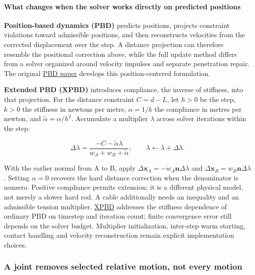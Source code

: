 \paragraph{What changes when the solver works directly on predicted positions}\label{06-engine-ii-ch033-what-changes-when-the-solver-works-directly-on-predicted-positions}

\hypertarget{06-engine-ii-ch033-what-changes-when-the-solver-works-directly-on-predicted-positions}{}

\textbf{Position-based dynamics (PBD)} predicts positions, projects constraint violations toward admissible positions, and then reconstructs velocities from the corrected displacement over the step. A distance projection can therefore resemble the positional correction above, while the full update method differs from a solver organized around velocity impulses and separate penetration repair. The original \href{https://doi.org/10.2312/PE/vriphys/vriphys06/071-080}{PBD paper} develops this position-centered formulation.

\textbf{Extended PBD (XPBD)} introduces compliance, the inverse of stiffness, into that projection. For the distance constraint \(C=d-L\), let \(h>0\) be the step, \(k>0\) the stiffness in newtons per metre, \(\alpha=1/k\) the compliance in metres per newton, and \(\widetilde\alpha=\alpha/h^2\). Accumulate a multiplier \(\lambda\) across solver iterations within the step:

\[
\Delta\lambda=\frac{-C-\widetilde\alpha\lambda}{w_A+w_B+\widetilde\alpha},\qquad
\lambda\leftarrow\lambda+\Delta\lambda.
\]

With the earlier normal from A to B, apply \(\Delta\mathbf x_A=-w_A\mathbf n\Delta\lambda\) and \(\Delta\mathbf x_B=w_B\mathbf n\Delta\lambda\). Setting \(\alpha=0\) recovers the hard distance correction when the denominator is nonzero. Positive compliance permits extension; it is a different physical model, not merely a slower hard rod. A cable additionally needs an inequality and an admissible tension multiplier. \href{https://mmacklin.com/xpbd.pdf}{XPBD} addresses the stiffness dependence of ordinary PBD on timestep and iteration count; finite convergence error still depends on the solver budget. Multiplier initialization, inter-step warm starting, contact handling and velocity reconstruction remain explicit implementation choices.

\subsubsection{A joint removes selected relative motion, not every motion}\label{06-engine-ii-ch033-a-joint-removes-selected-relative-motion-not-every-motion}

